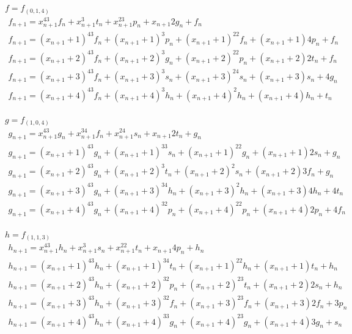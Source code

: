 \documentclass[a4paper, 14pt]{extarticle}
\begin{document}
$f=f_{(0,1,4)}$
$$
\begin{array}{l}
f_{n+1} = x_{n+1}^43f_{n} + x_{n+1}^3t_{n} + x_{n+1}^23p_{n} + x_{n+1}2g_{n} + f_{n} \\
f_{n+1} = (x_{n+1}+1)^43f_{n} + (x_{n+1}+1)^3p_{n} + (x_{n+1}+1)^22f_{n} + (x_{n+1}+1)4p_{n} + f_{n} \\
f_{n+1} = (x_{n+1}+2)^43f_{n} + (x_{n+1}+2)^3g_{n} + (x_{n+1}+2)^22p_{n} + (x_{n+1}+2)2t_{n} + f_{n} \\
f_{n+1} = (x_{n+1}+3)^43f_{n} + (x_{n+1}+3)^3s_{n} + (x_{n+1}+3)^24s_{n} + (x_{n+1}+3)s_{n} + 4g_{n} \\
f_{n+1} = (x_{n+1}+4)^43f_{n} + (x_{n+1}+4)^3h_{n} + (x_{n+1}+4)^2h_{n} + (x_{n+1}+4)h_{n} + t_{n} \\
\end{array}
$$

$g=f_{(1,0,4)}$
$$
\begin{array}{l}
g_{n+1} = x_{n+1}^43g_{n} + x_{n+1}^34f_{n} + x_{n+1}^24s_{n} + x_{n+1}2t_{n} + g_{n} \\
g_{n+1} = (x_{n+1}+1)^43g_{n} + (x_{n+1}+1)^33s_{n} + (x_{n+1}+1)^22g_{n} + (x_{n+1}+1)2s_{n} + g_{n} \\
g_{n+1} = (x_{n+1}+2)^43g_{n} + (x_{n+1}+2)^3t_{n} + (x_{n+1}+2)^2s_{n} + (x_{n+1}+2)3f_{n} + g_{n} \\
g_{n+1} = (x_{n+1}+3)^43g_{n} + (x_{n+1}+3)^34h_{n} + (x_{n+1}+3)^2h_{n} + (x_{n+1}+3)4h_{n} + 4t_{n} \\
g_{n+1} = (x_{n+1}+4)^43g_{n} + (x_{n+1}+4)^32p_{n} + (x_{n+1}+4)^22p_{n} + (x_{n+1}+4)2p_{n} + 4f_{n} \\
\end{array}
$$

$h=f_{(1,1,3)}$
$$
\begin{array}{l}
h_{n+1} = x_{n+1}^43h_{n} + x_{n+1}^3s_{n} + x_{n+1}^22t_{n} + x_{n+1}4p_{n} + h_{n} \\
h_{n+1} = (x_{n+1}+1)^43h_{n} + (x_{n+1}+1)^34t_{n} + (x_{n+1}+1)^22h_{n} + (x_{n+1}+1)t_{n} + h_{n} \\
h_{n+1} = (x_{n+1}+2)^43h_{n} + (x_{n+1}+2)^32p_{n} + (x_{n+1}+2)^23t_{n} + (x_{n+1}+2)2s_{n} + h_{n} \\
h_{n+1} = (x_{n+1}+3)^43h_{n} + (x_{n+1}+3)^32f_{n} + (x_{n+1}+3)^23f_{n} + (x_{n+1}+3)2f_{n} + 3p_{n} \\
h_{n+1} = (x_{n+1}+4)^43h_{n} + (x_{n+1}+4)^33g_{n} + (x_{n+1}+4)^23g_{n} + (x_{n+1}+4)3g_{n} + s_{n} \\
\end{array}
$$
\end{document}
